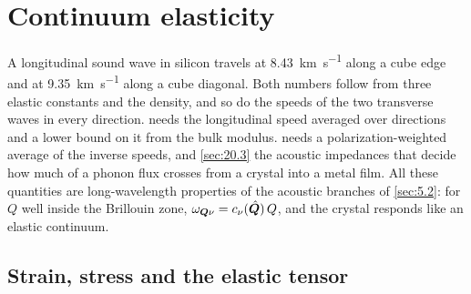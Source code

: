 \section{Continuum elasticity}\label{app:C.18}

A longitudinal sound wave in silicon travels at \SI{8.43}{km.s^{-1}} along a cube edge and at \SI{9.35}{km.s^{-1}} along a cube diagonal. Both numbers follow from three elastic constants and the density, and so do the speeds of the two transverse waves in every direction.  needs the longitudinal speed averaged over directions and a lower bound on it from the bulk modulus.  needs a polarization-weighted average of the inverse speeds, and \cref{sec:20.3} the acoustic impedances that decide how much of a phonon flux crosses from a crystal into a metal film. All these quantities are long-wavelength properties of the acoustic branches of \cref{sec:5.2}: for $Q$ well inside the Brillouin zone, $\omega_{\bm{Q}\nu} = c_\nu(\hat{\bm{Q}})\,Q$, and the crystal responds like an elastic continuum.

\subsection{Strain, stress and the elastic tensor}

